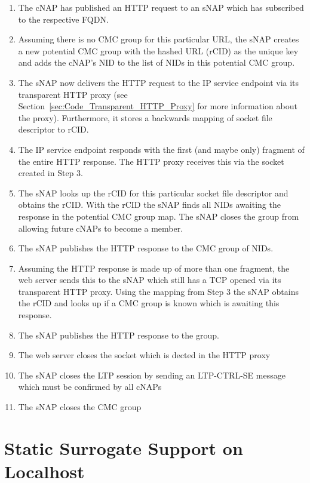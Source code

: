 \documentclass[a4paper,11pt,titlepage]{report}
\begin{document}
\begin{enumerate}
	\item The \ac{cNAP} has published an HTTP request to an \ac{sNAP} which has subscribed to the respective \ac{FQDN}.
	\item Assuming there is no \ac{CMC} group for this particular \ac{URL}, the \ac{sNAP} creates a new potential \ac{CMC} group with the hashed \ac{URL} (\ac{rCID}) as the unique key and adds the \ac{cNAP}'s \ac{NID} to the list of \acp{NID} in this potential \ac{CMC} group.
	\item The \ac{sNAP} now delivers the HTTP request to the IP service endpoint via its transparent HTTP proxy (see Section~\ref{sec:Code_Transparent_HTTP_Proxy} for more information about the proxy). Furthermore, it stores a backwards mapping of socket file descriptor to \ac{rCID}.
	\item The IP service endpoint responds with the first (and maybe only) fragment of the entire HTTP response. The HTTP proxy receives this via the socket created in Step 3. 
	\item The \ac{sNAP} looks up the \ac{rCID} for this particular socket file descriptor and obtains the \ac{rCID}. With the \ac{rCID} the \ac{sNAP} finds all \acp{NID} awaiting the response in the potential \ac{CMC} group map. The \ac{sNAP} closes the group from allowing future \acp{cNAP} to become a member.
	\item The \ac{sNAP} publishes the HTTP response to the \ac{CMC} group of \acp{NID}.
	\item Assuming the HTTP response is made up of more than one fragment, the web server sends this to the \ac{sNAP} which still has a TCP opened via its transparent HTTP proxy. Using the mapping from Step 3 the \ac{sNAP} obtains the \ac{rCID} and looks up if a \ac{CMC} group is known which is awaiting this response.
	\item The \ac{sNAP} publishes the HTTP response to the group.
	\item The web server closes the socket which is dected in the HTTP proxy
	\item The \ac{sNAP} closes the \ac{LTP} session by sending an \ac{LTP}-CTRL-\ac{SE} message which must be confirmed by all \acp{cNAP}
	\item The \ac{sNAP} closes the \ac{CMC} group
\end{enumerate}
\section{Static Surrogate Support on Localhost}
\end{document}
